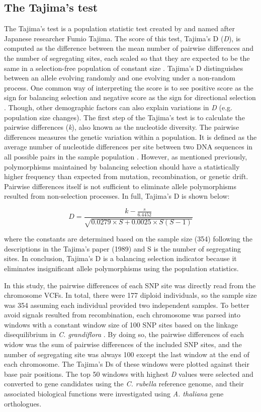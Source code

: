 \subsection{The Tajima’s test}
The Tajima’s test is a population statistic test created by and named after Japanese researcher Fumio Tajima. The score of this test, Tajima's D (\emph{D}), is computed as the difference between the mean number of pairwise differences and the number of segregating sites, each scaled so that they are expected to be the same in a selection-free population of constant size \citep{RN12}. Tajima’s D distinguishes between an allele evolving randomly and one evolving under a non-random process. One common way of interpreting the score is to see positive score as the sign for balancing selection and negative score as the sign for directional selection \citep{RN12}. Though, other demographic factors can also explain variations in \emph{D} (e.g. population size changes). The first step of the Tajima’s test is to calculate the pairwise differences (\emph{k}), also known as the nucleotide diversity. The pairwise differences measures the genetic variation within a population. It is defined as the average number of nucleotide differences per site between two DNA sequences in all possible pairs in the sample population \citep{RN13}. However, as mentioned previously, polymorphisms maintained by balancing selection should have a statistically higher frequency than expected from mutation, recombination, or genetic drift. Pairwise differences itself is not sufficient to eliminate allele polymorphisms resulted from non-selection processes. In full, Tajima’s D is shown below:

\begin{equation}
D=\frac{k-\frac{s}{6.4452}}{\sqrt{0.0279\times S+0.0025\times S(S-1)}}
\end{equation}

\noindent where the constants are determined based on the sample size (354) following the descriptions in the Tajima’s paper (1989) and S is the number of segregating sites. In conclusion, Tajima’s D is a balancing selection indicator because it eliminates insignificant allele polymorphisms using the population statistics.

In this study, the pairwise differences of each SNP site was directly read from the chromosome VCFs. In total, there were 177 diploid individuals, so the sample size was 354 assuming each individual provided two independent samples. To better avoid signals resulted from recombination, each chromosome was parsed into windows with a constant window size of 100 SNP sites based on the linkage disequilibrium in \emph{C. grandiflora} \citep{RN11}. By doing so, the pairwise differences of each widow was the sum of pairwise differences of the included SNP sites, and the number of segregating site was always 100 except the last window at the end of each chromosome. The Tajima’s Ds of these windows were plotted against their base pair positions. The top 50 windows with highest \emph{D} values were selected and converted to gene candidates using the \emph{C. rubella} reference genome, and their associated biological functions were investigated using \emph{A. thaliana} gene orthologues.

